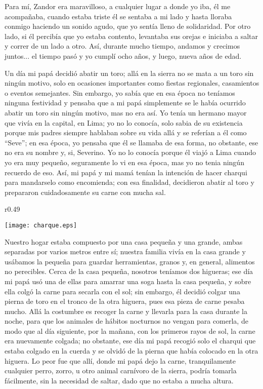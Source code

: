 Para mí, Zandor era maravilloso, a cualquier lugar a donde yo iba, él me acompañaba, cuando estaba triste él se sentaba a mi lado y hasta lloraba conmigo haciendo un sonido agudo, que yo sentía lleno de solidaridad.
Por otro lado, si él percibía que yo estaba contento, levantaba sus orejas e iniciaba a saltar y correr de un lado a otro. Así, durante mucho tiempo, andamos y crecimos juntos... el tiempo pasó y yo cumplí ocho años, y luego, nueva años de edad.

Un día mi papá decidió abatir un toro; allá en la sierra no se mata a un toro sin ningún motivo, solo en ocasiones importantes como fiestas regionales, casamientos o eventos semejantes. Sin embargo, yo sabía que en esa época no teníamos ninguna festividad y pensaba que a mi papá simplemente se le había ocurrido abatir un toro sin ningún motivo, mas no era así.
Yo tenía un hermano mayor que vivía en la capital, en Lima; yo no lo conocía, solo sabia de su existencia porque mis padres siempre hablaban sobre su vida allá y se referían a él como ``Seve''; en esa época, yo pensaba que él se llamaba de esa forma, no obstante, ese no era su nombre y, si, Severino. Yo no lo conocía porque él viajó a Lima cuando yo era muy pequeño, seguramente lo vi en esa época, mas yo no tenia ningún recuerdo de eso.
Así, mi papá y mi mamá tenían la intención de hacer charqui para mandarselo como encomienda; con esa finalidad, decidieron abatir al toro y prepararon cuidadosamente su carne con mucha sal.

\ifdefined\EnableIncludeImages
\begin{wrapfigure}{r}{0.49\textwidth}
  \begin{center}
  \vspace{-20pt}
    \texttt{[image: charque.eps]}
  \end{center}
  \vspace{-20pt}
\end{wrapfigure}
\fi
Nuestro hogar estaba compuesto por una casa pequeña y una grande, ambas separadas por varios metros entre sí; nuestra familia vivía en la casa grande y usábamos la pequeña para guardar herramientas, granos y, en general, alimentos no perecibles.
Cerca de la casa pequeña, nosotros teníamos dos higueras; ese día mi papá usó una de ellas para amarrar una soga hasta la casa pequeña, y sobre ella colgó la carne para secarla con el sol; sin embargo, él decidió colgar una pierna de toro en el tronco de la otra higuera, pues esa pieza de carne pesaba mucho.
Allá la costumbre es recoger la carne y llevarla para la casa durante la noche, para que los animales de hábitos nocturnos no vengan para comerla, de modo que al día siguiente, por la mañana, con los primeros rayos de sol, la carne era nuevamente colgada; no obstante, ese día mi papá recogió solo el charqui que estaba colgado en la cuerda y se olvidó de la pierna que había colocado en la otra higuera.
Lo peor fue que allí, donde mi papá dejo la carne, tranquilamente cualquier perro, zorro, u otro animal carnívoro de la sierra, podría tomarla fácilmente, sin la necesidad de saltar, dado que no estaba a mucha altura.

